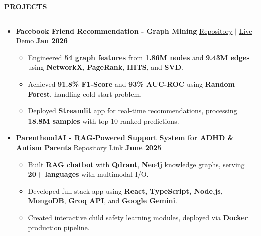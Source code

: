 \documentclass[letterpaper,10pt]{article}
\newcommand{\sectionheader}[1]{%
    \vspace{3pt}
    \noindent\textbf{\large #1}
    \rule{\linewidth}{0.4pt}
    \vspace{-2pt}
}
\begin{document}
\sectionheader{PROJECTS}
\begin{itemize}[leftmargin=*,label=\textbullet, noitemsep, topsep=0pt, partopsep=0pt]
    \item \textbf{Facebook Friend Recommendation - Graph Mining} \quad \href{https://github.com/AdiSinghCodes/Facebook-Friend-Recommendation-Graph-Mining.git}{\underline{Repository}} $|$ \href{https://facebook-friend-recommendation-graph-mining-jdhh3za4cvgj6qtapp.streamlit.app/}{\underline{Live Demo}} \hfill \textbf{Jan 2026}
    \begin{itemize}[leftmargin=0.75cm,label=$\circ$, noitemsep, topsep=0pt, partopsep=0pt]
        \item Engineered \textbf{54 graph features} from \textbf{1.86M nodes} and \textbf{9.43M edges} using \textbf{NetworkX}, \textbf{PageRank}, \textbf{HITS}, and \textbf{SVD}.
        \item Achieved \textbf{91.8\% F1-Score} and \textbf{93\% AUC-ROC} using \textbf{Random Forest}, handling cold start problem.
        \item Deployed \textbf{Streamlit} app for real-time recommendations, processing \textbf{18.8M samples} with top-10 ranked predictions.
    \end{itemize}

    \vspace{1pt}

    \item \textbf{ParenthoodAI - RAG-Powered Support System for ADHD \& Autism Parents} \quad \href{https://github.com/AdiSinghCodes/ParenthoodAI---RAG-Powered-Support-System-for-ADHD-Autism-Parents.git}{\underline{Repository Link}} \hfill \textbf{June 2025}
    \begin{itemize}[leftmargin=0.75cm,label=$\circ$, noitemsep, topsep=0pt, partopsep=0pt]
        \item Built \textbf{RAG chatbot} with \textbf{Qdrant}, \textbf{Neo4j} knowledge graphs, serving \textbf{20+ languages} with multimodal I/O.
        \item Developed full-stack app using \textbf{React, TypeScript, Node.js}, \textbf{MongoDB}, \textbf{Groq API}, and \textbf{Google Gemini}.
        \item Created interactive child safety learning modules, deployed via \textbf{Docker} production pipeline.
    \end{itemize}

    \vspace{1pt}


\end{itemize}
\end{document}
